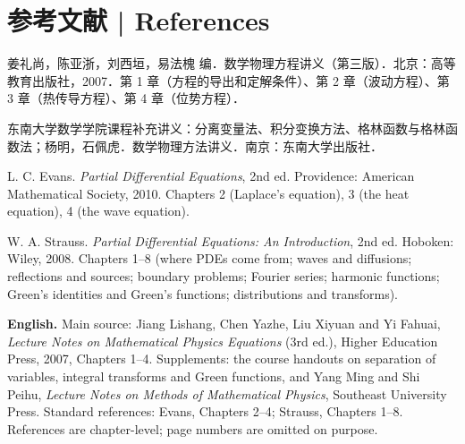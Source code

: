 \documentclass[UTF8,11pt,a4paper]{ctexart}
\newcommand{\EN}[1]{\par\noindent \textbf{English.} #1\par}
\begin{document}
\section*{参考文献 | References}
\noindent 姜礼尚，陈亚浙，刘西垣，易法槐 编．数学物理方程讲义（第三版）．北京：高等教育出版社，2007．第 1 章（方程的导出和定解条件）、第 2 章（波动方程）、第 3 章（热传导方程）、第 4 章（位势方程）．\par
\noindent 东南大学数学学院课程补充讲义：分离变量法、积分变换方法、格林函数与格林函数法；杨明，石佩虎．数学物理方法讲义．南京：东南大学出版社．\par
\noindent L. C. Evans. \emph{Partial Differential Equations}, 2nd ed. Providence: American Mathematical Society, 2010. Chapters 2 (Laplace's equation), 3 (the heat equation), 4 (the wave equation).\par
\noindent W. A. Strauss. \emph{Partial Differential Equations: An Introduction}, 2nd ed. Hoboken: Wiley, 2008. Chapters 1--8 (where PDEs come from; waves and diffusions; reflections and sources; boundary problems; Fourier series; harmonic functions; Green's identities and Green's functions; distributions and transforms).\par
\EN{Main source: Jiang Lishang, Chen Yazhe, Liu Xiyuan and Yi Fahuai, \emph{Lecture Notes on Mathematical Physics Equations} (3rd ed.), Higher Education Press, 2007, Chapters 1--4. Supplements: the course handouts on separation of variables, integral transforms and Green functions, and Yang Ming and Shi Peihu, \emph{Lecture Notes on Methods of Mathematical Physics}, Southeast University Press. Standard references: Evans, Chapters 2--4; Strauss, Chapters 1--8. References are chapter-level; page numbers are omitted on purpose.}
\end{document}
